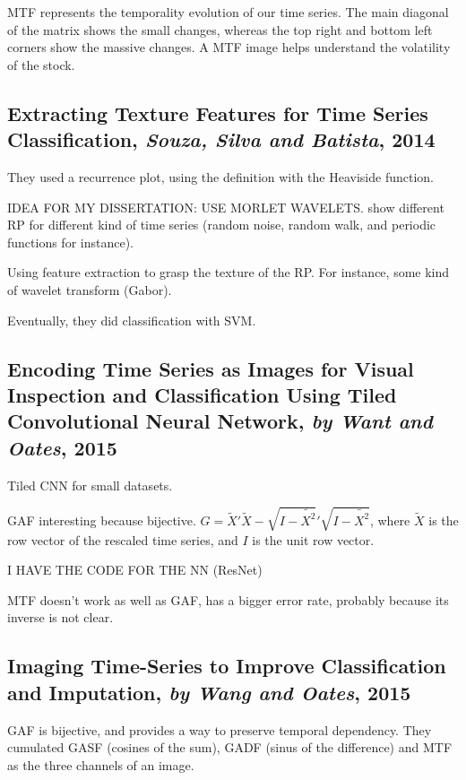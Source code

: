 \documentclass[11pt]{article}
\begin{document}
\begin{onehalfspace}
MTF represents the temporality evolution of our time series. The main diagonal of the matrix shows the small changes, whereas the top right and bottom left corners show the massive changes. A MTF image helps understand the volatility of the stock.

\subsection{Extracting Texture Features for Time Series Classiﬁcation, \textit{Souza, Silva and Batista}, 2014}

They used a recurrence plot, using the definition with the Heaviside function.

IDEA FOR MY DISSERTATION: USE MORLET WAVELETS. show different RP for different kind of time series (random noise, random walk, and periodic functions for instance).

Using feature extraction to grasp the texture of the RP. For instance, some kind of wavelet transform (Gabor).

Eventually, they did classification with SVM.

\subsection{Encoding Time Series as Images for Visual Inspection and Classiﬁcation Using Tiled Convolutional Neural Network, \textit{by Want and Oates}, 2015}

Tiled CNN for small datasets.

GAF interesting because bijective. $G = \tilde{X}' \tilde{X} - \sqrt{I - \tilde{X^2}} '\sqrt{I - \tilde{X^2}}$, where $\tilde{X}$ is the row vector of the rescaled time series, and $I$ is the unit row vector.

I HAVE THE CODE FOR THE NN (ResNet)

MTF doesn't work as well as GAF, has a bigger error rate, probably because its inverse is not clear. 

\subsection{Imaging Time-Series to Improve Classiﬁcation and Imputation, \textit{by Wang and Oates}, 2015}

GAF is bijective, and  provides a way to preserve temporal dependency. They cumulated GASF (cosines of the sum), GADF (sinus of the difference) and MTF as the three channels of an image.


\end{onehalfspace}
\end{document}
